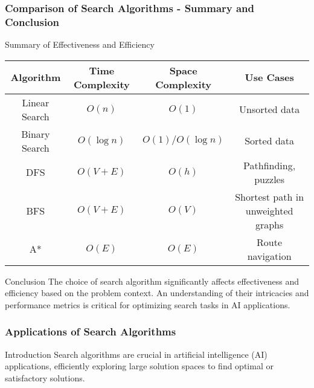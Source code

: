 \documentclass[aspectratio=169]{beamer}
\begin{document}
\begin{frame}[fragile]
    \frametitle{Comparison of Search Algorithms - Summary and Conclusion}
    \begin{block}{Summary of Effectiveness and Efficiency}
        \begin{tabular}{|c|c|c|c|}
            \hline
            Algorithm & Time Complexity & Space Complexity & Use Cases \\
            \hline
            Linear Search & $O(n)$ & $O(1)$ & Unsorted data \\
            Binary Search & $O(\log n)$ & $O(1) / O(\log n)$ & Sorted data \\
            DFS & $O(V + E)$ & $O(h)$ & Pathfinding, puzzles \\
            BFS & $O(V + E)$ & $O(V)$ & Shortest path in unweighted graphs \\
            A* & $O(E)$ & $O(E)$ & Route navigation \\
            \hline
        \end{tabular}
    \end{block}
    \begin{block}{Conclusion}
        The choice of search algorithm significantly affects effectiveness and efficiency based on the problem context. An understanding of their intricacies and performance metrics is critical for optimizing search tasks in AI applications.
    \end{block}
\end{frame}

\begin{frame}[fragile]
    \frametitle{Applications of Search Algorithms}
    \begin{block}{Introduction}
        Search algorithms are crucial in artificial intelligence (AI) applications, efficiently exploring large solution spaces to find optimal or satisfactory solutions.
    \end{block}
\end{frame}
\end{document}
